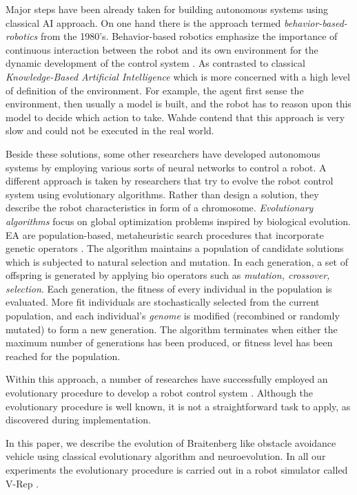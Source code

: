 \documentclass[format=acmsmall, review=false, screen=true]{acmart}
\begin{document}
Major steps have been already taken for building autonomous systems using classical AI approach. On one hand there is the approach termed \emph{behavior-based-robotics} from the 1980's\cite{arkin1998behavior}. Behavior-based robotics emphasize the importance of continuous interaction between the robot and its own environment for the dynamic development of the control system \cite{siciliano2016springer}. As contrasted to classical \emph{Knowledge-Based Artificial Intelligence} which is more concerned with a high level of definition of the environment. For example, the agent first sense the environment, then usually a model is built, and the robot has to reason upon this model to decide which action to take. Wahde\cite{wahde2004evolutionary} contend that this approach is very slow and could not be executed in the real world.


Beside these solutions, some other researchers have developed autonomous systems by employing various sorts of neural networks to control a robot. A  different approach is taken by researchers that try to evolve the robot control system using evolutionary algorithms. Rather than design a solution, they describe the robot characteristics in form of a chromosome. \emph{Evolutionary algorithms} \cite{back1996evolutionary} focus on global optimization problems inspired by biological evolution. EA are population-based, metaheuristic search procedures that incorporate genetic operators \cite{back1996evolutionary}. The algorithm maintains a population of candidate solutions which is subjected to natural selection and mutation. In each generation, a set of offspring is generated by applying bio operators such as \emph{mutation, crossover, selection}. Each generation, the fitness of every individual in the population is evaluated. More fit individuals are stochastically selected from the current population, and each individual's \emph{genome} is modified (recombined or randomly mutated) to form a new generation. The algorithm terminates when either the maximum number of generations has been produced, or fitness level has been reached for the population.

Within this approach, a number of researches have successfully employed an evolutionary procedure to develop a robot control system \cite{salomon1999evolving}. Although the evolutionary procedure is well known, it is not a straightforward task to apply, as discovered during implementation.

In this paper, we describe the evolution of Braitenberg like obstacle avoidance vehicle using classical evolutionary algorithm and neuroevolution. In all our experiments the evolutionary procedure is carried out in a robot simulator called V-Rep \cite{rohmer2013v}.
\end{document}
